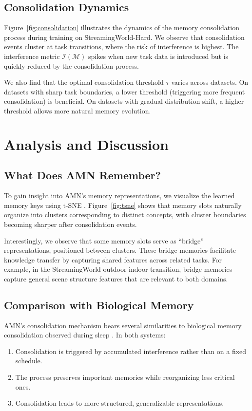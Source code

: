 \documentclass[11pt]{article}
\begin{document}
\subsection{Consolidation Dynamics}

Figure~\ref{fig:consolidation} illustrates the dynamics of the memory consolidation process during training on StreamingWorld-Hard. We observe that consolidation events cluster at task transitions, where the risk of interference is highest. The interference metric $\mathcal{I}(\mathcal{M})$ spikes when new task data is introduced but is quickly reduced by the consolidation process.

We also find that the optimal consolidation threshold $\tau$ varies across datasets. On datasets with sharp task boundaries, a lower threshold (triggering more frequent consolidation) is beneficial. On datasets with gradual distribution shift, a higher threshold allows more natural memory evolution.

\section{Analysis and Discussion}
\label{sec:analysis}

\subsection{What Does AMN Remember?}

To gain insight into AMN's memory representations, we visualize the learned memory keys using t-SNE \citep{maaten2008visualizing}. Figure~\ref{fig:tsne} shows that memory slots naturally organize into clusters corresponding to distinct concepts, with cluster boundaries becoming sharper after consolidation events.

Interestingly, we observe that some memory slots serve as ``bridge'' representations, positioned between clusters. These bridge memories facilitate knowledge transfer by capturing shared features across related tasks. For example, in the StreamingWorld outdoor-indoor transition, bridge memories capture general scene structure features that are relevant to both domains.

\subsection{Comparison with Biological Memory}

AMN's consolidation mechanism bears several similarities to biological memory consolidation observed during sleep \citep{walker2017sleep}. In both systems:
\begin{enumerate}
    \item Consolidation is triggered by accumulated interference rather than on a fixed schedule.
    \item The process preserves important memories while reorganizing less critical ones.
    \item Consolidation leads to more structured, generalizable representations.
\end{enumerate}
\end{document}
